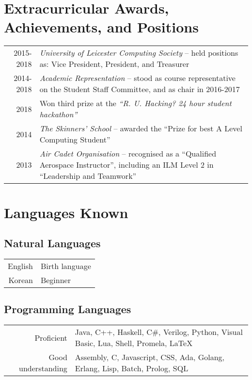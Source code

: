 \documentclass[a4paper]{article}
\begin{document}
\section*{Extracurricular Awards, Achievements, and Positions}
\begin{tabular}{rp{11.75cm}}
  2015-2018 & \emph{University of Leicester Computing Society} -- held positions as: Vice President, President, and Treasurer \\
  2014-2018 & \emph{Academic Representation} -- stood as course representative on the Student Staff Committee, and as chair in 2016-2017 \\
  2018 & Won third prize at the \emph{``R. U. Hacking? 24 hour student hackathon''} \\
  2014 & \emph{The Skinners' School} -- awarded the ``Prize for best A Level Computing Student'' \\
  2013 & \emph{Air Cadet Organisation} -- recognised as a ``Qualified Aerospace Instructor'', including an ILM Level 2 in ``Leadership and Teamwork''
\end{tabular}

\section*{Languages Known}
\subsection*{Natural Languages}
\begin{tabular}{rl}
  English & Birth language \\
  Korean & Beginner
\end{tabular}
\subsection*{Programming Languages}
\begin{tabular}{r|p{11.75cm}}
  Proficient & Java, C++, Haskell, C\#, Verilog, Python, Visual Basic, Lua, Shell, Promela, LaTeX \\
  Good understanding & Assembly, C, Javascript, CSS, Ada, Golang, Erlang, Lisp, Batch, Prolog, SQL
\end{tabular}
\end{document}
